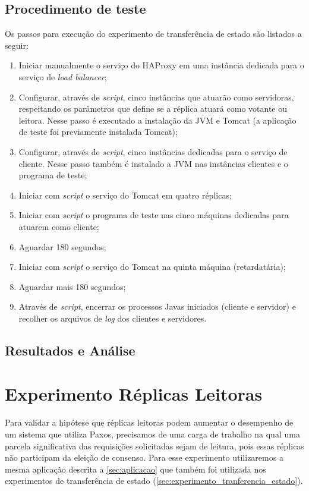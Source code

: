 \subsection{Procedimento de teste}

Os passos para execução do experimento de transferência de estado são listados a seguir:

\begin{enumerate}
  \item Iniciar manualmente o serviço do HAProxy em uma instância dedicada para o serviço
    de \emph{load balancer};
  \item Configurar, através de \emph{script}, cinco instâncias que atuarão como
    servidoras, respeitando os parâmetros que define se a réplica atuará como votante ou
    leitora. Nesse passo é executado a instalação da JVM e Tomcat (a aplicação de teste
    foi previamente instalada Tomcat);
  \item Configurar, através de \emph{script}, cinco instâncias dedicadas para o serviço de
    cliente. Nesse passo também é instalado a JVM nas instâncias clientes e o programa de
    teste;
  \item Iniciar com \emph{script} o serviço do Tomcat em quatro réplicas;
  \item Iniciar com \emph{script} o programa de teste nas cinco máquinas dedicadas para
    atuarem como cliente;
  \item Aguardar 180 segundos;
  \item Iniciar com \emph{script} o serviço do Tomcat na quinta máquina (retardatária);
  \item Aguardar mais 180 segundos;
  \item Através de \emph{script}, encerrar os processos Javas iniciados (cliente e
    servidor) e recolher os arquivos de \emph{log} dos clientes e servidores.
\end{enumerate}

\subsection{Resultados e Análise}


\section{Experimento Réplicas Leitoras}\label{sec:experimento_replicas_leitoras}

Para validar a hipótese que réplicas leitoras podem aumentar o desempenho de um sistema
que utiliza Paxos, precisamos de uma carga de trabalho na qual uma parcela significativa
das requisições solicitadas sejam de leitura, pois essas réplicas não participam da
eleição de consenso. Para esse experimento utilizaremos a mesma aplicação descrita a
\autoref{sec:aplicacao} que também foi utilizada nos experimentos de transferência de
estado (\autoref{sec:experimento_tranferencia_estado}).

